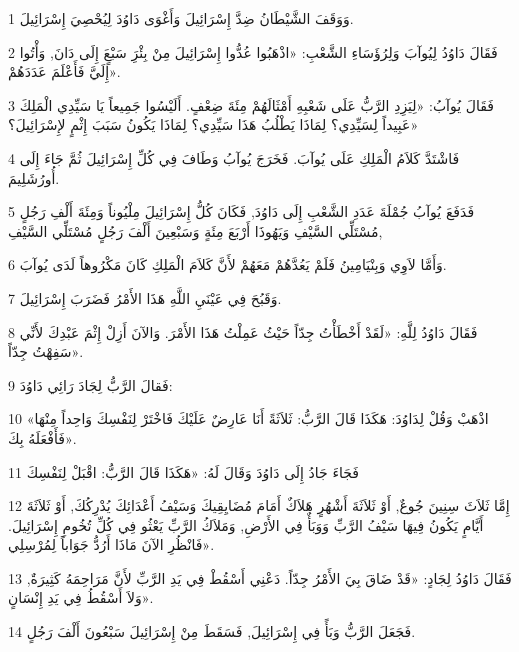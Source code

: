 \par 1 وَوَقَفَ الشَّيْطَانُ ضِدَّ إِسْرَائِيلَ وَأَغْوَى دَاوُدَ لِيُحْصِيَ إِسْرَائِيلَ.
\par 2 فَقَالَ دَاوُدُ لِيُوآبَ وَلِرُؤَسَاءِ الشَّعْبِ: «اذْهَبُوا عُدُّوا إِسْرَائِيلَ مِنْ بِئْرَِ سَبْعٍَ إِلَى دَانَ, وَأْتُوا إِلَيَّ فَأَعْلَمَ عَدَدَهُمْ».
\par 3 فَقَالَ يُوآبُ: «لِيَزِدِ الرَّبُّ عَلَى شَعْبِهِ أَمْثَالَهُمْ مِئَةَ ضِعْفٍ. أَلَيْسُوا جَمِيعاً يَا سَيِّدِي الْمَلِكَ عَبِيداً لِسَيِّدِي؟ لِمَاذَا يَطْلُبُ هَذَا سَيِّدِي؟ لِمَاذَا يَكُونُ سَبَبَ إِثْمٍ لإِسْرَائِيلَ؟»
\par 4 فَاشْتَدَّ كَلاَمُ الْمَلِكِ عَلَى يُوآبَ. فَخَرَجَ يُوآبُ وَطَافَ فِي كُلِّ إِسْرَائِيلَ ثُمَّ جَاءَ إِلَى أُورُشَلِيمَ.
\par 5 فَدَفَعَ يُوآبُ جُمْلَةَ عَدَدِ الشَّعْبِ إِلَى دَاوُدَ, فَكَانَ كُلُّ إِسْرَائِيلَ مِلْيُوناً وَمِئَةَ أَلْفِ رَجُلٍ مُسْتَلِّي السَّيْفِ وَيَهُوذَا أَرْبَعَ مِئَةٍ وَسَبْعِينَ أَلْفَ رَجُلٍ مُسْتَلِّي السَّيْفِ,
\par 6 وَأَمَّا لاَوِي وَبِنْيَامِينُ فَلَمْ يَعُدَّهُمْ مَعَهُمْ لأَنَّ كَلاَمَ الْمَلِكِ كَانَ مَكْرُوهاً لَدَى يُوآبَ.
\par 7 وَقَبُحَ فِي عَيْنَيِ اللَّهِ هَذَا الأَمْرُ فَضَرَبَ إِسْرَائِيلَ.
\par 8 فَقَالَ دَاوُدُ لِلَّهِ: «لَقَدْ أَخْطَأْتُ جِدّاً حَيْثُ عَمِلْتُ هَذَا الأَمْرَ. وَالآنَ أَزِلْ إِثْمَ عَبْدِكَ لأَنِّي سَفِهْتُ جِدّاً».
\par 9 فَقالَ الرَّبُّ لِجَادَ رَائِي دَاوُدَ:
\par 10 «اذْهَبْ وَقُلْ لِدَاوُدَ: هَكَذَا قَالَ الرَّبُّ: ثَلاَثَةً أَنَا عَارِضٌ عَلَيْكَ فَاخْتَرْ لِنَفْسِكَ وَاحِداً مِنْهَا فَأَفْعَلَهُ بِكَ».
\par 11 فَجَاءَ جَادُ إِلَى دَاوُدَ وَقَالَ لَهُ: «هَكَذَا قَالَ الرَّبُّ: اقْبَلْ لِنَفْسِكَ
\par 12 إِمَّا ثَلاَثَ سِنِينَ جُوعٌ, أَوْ ثَلاَثَةَ أَشْهُرٍ هَلاَكٌ أَمَامَ مُضَايِقِيكَ وَسَيْفُ أَعْدَائِكَ يُدْرِكُكَ, أَوْ ثَلاَثَةَ أَيَّامٍ يَكُونُ فِيهَا سَيْفُ الرَّبِّ وَوَبَأٌ فِي الأَرْضِ, وَمَلاَكُ الرَّبِّ يَعْثُو فِي كُلِّ تُخُومِ إِسْرَائِيلَ. فَانْظُرِ الآنَ مَاذَا أَرُدُّ جَوَاباً لِمُرْسِلِي».
\par 13 فَقَالَ دَاوُدُ لِجَادٍ: «قَدْ ضَاقَ بِيَ الأَمْرُ جِدّاً. دَعْنِي أَسْقُطْ فِي يَدِ الرَّبِّ لأَنَّ مَرَاحِمَهُ كَثِيرَةٌ, وَلاَ أَسْقُطُ فِي يَدِ إِنْسَانٍ».
\par 14 فَجَعَلَ الرَّبُّ وَبَأً فِي إِسْرَائِيلَ, فَسَقَطَ مِنْ إِسْرَائِيلَ سَبْعُونَ أَلْفَ رَجُلٍ.
